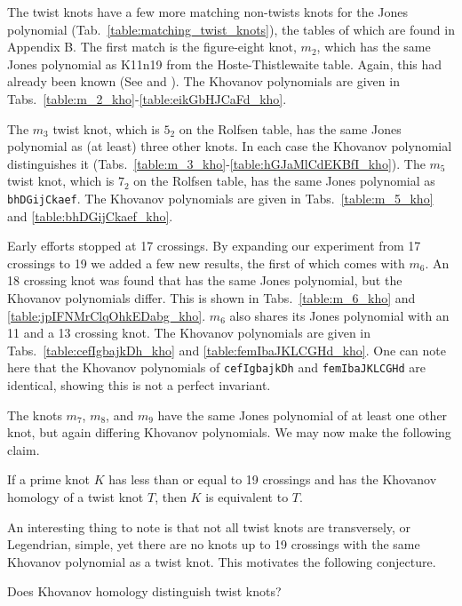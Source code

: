     The twist knots have a few more matching non-twists knots for the
    Jones polynomial (Tab.~\ref{table:matching_twist_knots}), the tables of
    which are found in Appendix B. The first match is the
    figure-eight knot, $m_{2}$, which has the same Jones polynomial as
    K11n19 from the Hoste-Thistlewaite table.
    Again, this had already been known
    (See \cite{KatlasFigureEight} and \cite{KatlasK11n19}).
    The Khovanov polynomials are
    given in Tabs.~\ref{table:m_2_kho}-\ref{table:eikGbHJCaFd_kho}.
    \par\hfill\par
    The $m_{3}$ twist knot, which is $5_{2}$ on the Rolfsen table,
    has the same Jones polynomial as (at least) three other knots. In each
    case the Khovanov polynomial distinguishes it
    (Tabs.~\ref{table:m_3_kho}-\ref{table:hGJaMlCdEKBfI_kho}).
    The $m_{5}$ twist knot, which is $7_{2}$ on the Rolfsen table, has the
    same Jones polynomial as \texttt{bhDGijCkaef}. The Khovanov polynomials
    are given in Tabs.~\ref{table:m_5_kho} and \ref{table:bhDGijCkaef_kho}.
    \par\hfill\par
    Early efforts stopped at 17 crossings. By
    expanding our experiment from 17 crossings to 19 we added a few new
    results, the first of which comes with
    $m_{6}$. An 18 crossing knot was found
    that has the same Jones polynomial, but the Khovanov polynomials
    differ. This is shown in
    Tabs.~\ref{table:m_6_kho} and \ref{table:jpIFNMrClqOhkEDabg_kho}.
    $m_{6}$ also shares its Jones polynomial with an 11 and a 13 crossing
    knot. The Khovanov polynomials are given in
    Tabs.~\ref{table:cefIgbajkDh_kho} and
    \ref{table:femIbaJKLCGHd_kho}.
    One can note here that the Khovanov polynomials of \texttt{cefIgbajkDh} and
    \texttt{femIbaJKLCGHd} are identical, showing this is not a perfect
    invariant.
    \par\hfill\par
    The knots $m_{7}$, $m_{8}$, and $m_{9}$ have the same Jones polynomial
    of at least one other knot, but again differing Khovanov polynomials.
    We may now make the following claim.
    \begin{theorem}
        If a prime knot $K$ has less than or equal to 19 crossings and has
        the Khovanov homology of a twist knot $T$,
        then $K$ is equivalent to $T$.
    \end{theorem}
    An interesting thing to note is that not all twist knots are
    transversely, or Legendrian, simple, yet there are no knots up to
    19 crossings with the same Khovanov polynomial as a twist knot. This
    motivates the following conjecture.
    \begin{question}
        Does Khovanov homology distinguish twist knots?
    \end{question}
